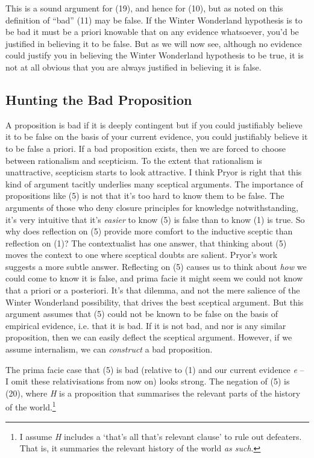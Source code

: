 This is a sound argument for (19), and hence for (10), but as noted on
this definition of ``bad'' (11) may be false. If the Winter Wonderland
hypothesis is to be bad it must be a priori knowable that on any
evidence whatsoever, you'd be justified in believing it to be false. But
as we will now see, although no evidence could justify you in believing
the Winter Wonderland hypothesis to be true, it is not at all obvious
that you are always justified in believing it is false.

\hypertarget{hunting-the-bad-proposition}{%
\subsection{Hunting the Bad
Proposition}\label{hunting-the-bad-proposition}}

A proposition is bad if it is deeply contingent but if you could
justifiably believe it to be false on the basis of your current
evidence, you could justifiably believe it to be false a priori. If a
bad proposition exists, then we are forced to choose between rationalism
and scepticism. To the extent that rationalism is unattractive,
scepticism starts to look attractive. I think Pryor is right that this
kind of argument tacitly underlies many sceptical arguments. The
importance of propositions like (5) is not that it's too hard to know
them to be false. The arguments of those who deny closure principles for
knowledge notwithstanding, it's very intuitive that it's \emph{easier}
to know (5) is false than to know (1) is true. So why does reflection on
(5) provide more comfort to the inductive sceptic than reflection on
(1)? The contextualist has one answer, that thinking about (5) moves the
context to one where sceptical doubts are salient. Pryor's work suggests
a more subtle answer. Reflecting on (5) causes us to think about
\emph{how} we could come to know it is false, and prima facie it might
seem we could not know that a priori or a posteriori. It's that dilemma,
and not the mere salience of the Winter Wonderland possibility, that
drives the best sceptical argument. But this argument assumes that (5)
could not be known to be false on the basis of empirical evidence, i.e.
that it is bad. If it is not bad, and nor is any similar proposition,
then we can easily deflect the sceptical argument. However, if we assume
internalism, we can \emph{construct} a bad proposition.

The prima facie case that (5) is bad (relative to (1) and our current
evidence \emph{e} -- I omit these relativisations from now on) looks
strong. The negation of (5) is (20), where \emph{H} is a proposition
that summarises the relevant parts of the history of the
world.\footnote{I assume \emph{H} includes a `that's all that's relevant
  clause' to rule out defeaters. That is, it summaries the relevant
  history of the world \emph{as such}.}

